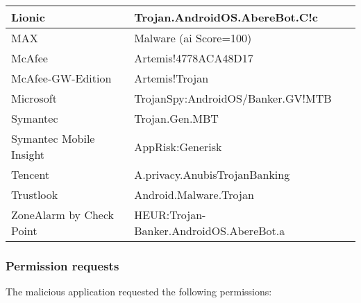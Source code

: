 \begin{tabular}{ |l|l| }
    \hline
        Lionic  &   Trojan.AndroidOS.AbereBot.C!c \\
    \hline
        MAX     &   Malware (ai Score=100) \\
    \hline
        McAfee  &   Artemis!4778ACA48D17 \\
    \hline
        McAfee-GW-Edition   &   Artemis!Trojan \\
    \hline
        Microsoft   &   TrojanSpy:AndroidOS/Banker.GV!MTB \\
    \hline
        Symantec    &   Trojan.Gen.MBT \\
    \hline
        Symantec Mobile Insight     &   AppRisk:Generisk \\
    \hline
        Tencent     &   A.privacy.AnubisTrojanBanking \\
    \hline
        Trustlook   &   Android.Malware.Trojan \\
    \hline
        ZoneAlarm by Check Point    &   HEUR:Trojan-Banker.AndroidOS.AbereBot.a \\
    \hline
\end{tabular}

\newpage
\subsubsection{Permission requests}
The malicious application requested the following permissions:

